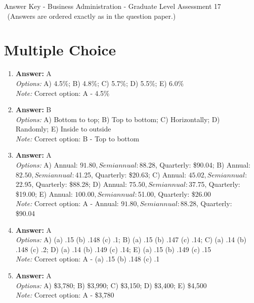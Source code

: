 \documentclass[12pt]{article}
\begin{document}
\begin{center}
Answer Key - Business Administration - Graduate Level Assessment 17 \
\small (Answers are ordered exactly as in the question paper.)
\end{center}

\section*{Multiple Choice}
\begin{enumerate}[label=\arabic*.]
\item \textbf{Answer:} A
\\ \textit{Options:} A) 4.5\%; B) 4.8\%; C) 5.7\%; D) 5.5\%; E) 6.0\%
\\ \textit{Note:} Correct option: A - 4.5\%
\item \textbf{Answer:} B
\\ \textit{Options:} A) Bottom to top; B) Top to bottom; C) Horizontally; D) Randomly; E) Inside to outside
\\ \textit{Note:} Correct option: B - Top to bottom
\item \textbf{Answer:} A
\\ \textit{Options:} A) Annual: $91.80, Semiannual: $88.28, Quarterly: \$90.04; B) Annual: $82.50, Semiannual: $41.25, Quarterly: \$20.63; C) Annual: $45.02, Semiannual: $22.95, Quarterly: \$88.28; D) Annual: $75.50, Semiannual: $37.75, Quarterly: \$19.00; E) Annual: $100.00, Semiannual: $51.00, Quarterly: \$26.00
\\ \textit{Note:} Correct option: A - Annual: $91.80, Semiannual: $88.28, Quarterly: \$90.04
\item \textbf{Answer:} A
\\ \textit{Options:} A) (a) .15 (b) .148 (c) .1; B) (a) .15 (b) .147 (c) .14; C) (a) .14 (b) .148 (c) .2; D) (a) .14 (b) .149 (c) .14; E) (a) .15 (b) .149 (c) .15
\\ \textit{Note:} Correct option: A - (a) .15 (b) .148 (c) .1
\item \textbf{Answer:} A
\\ \textit{Options:} A) \$3,780; B) \$3,990; C) \$3,150; D) \$3,400; E) \$4,500
\\ \textit{Note:} Correct option: A - \$3,780
\end{enumerate}
\end{document}
